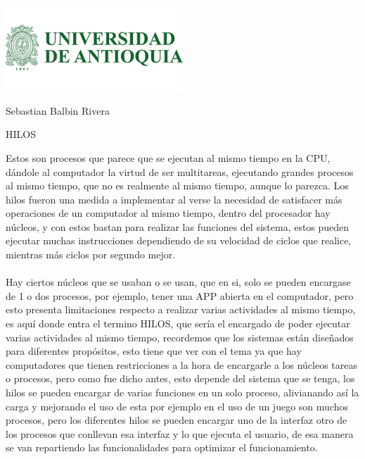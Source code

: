 \documentclass[12pt]{letter}
\begin{document}
\begin{center}
\includegraphics[width=0.5\textwidth]{logo-udea.png}\\
\end{center}

Sebastian Balbin Rivera\\
\begin{center}
HILOS
\end{center}
Estos son procesos que parece que se ejecutan al mismo tiempo en la CPU, dándole al computador la virtud de ser multitareas, ejecutando grandes procesos al mismo tiempo, que no es realmente al mismo tiempo, aunque lo parezca. Los hilos fueron una medida a implementar al verse la necesidad de satisfacer más operaciones de un computador al mismo tiempo, dentro del procesador hay núcleos, y con estos bastan para realizar las funciones del sistema, estos pueden ejecutar muchas instrucciones dependiendo de su velocidad de ciclos que realice, mientras más ciclos por segundo mejor. \\\\
Hay ciertos núcleos que se usaban o se usan, que en si, solo se pueden encargase de 1 o dos procesos, por ejemplo, tener una APP abierta en el computador, pero esto presenta limitaciones respecto a realizar varias actividades al mismo tiempo, es aquí donde entra el termino HILOS, que sería el encargado de poder ejecutar varias actividades al mismo tiempo, recordemos que los sistemas están diseñados para diferentes propósitos, esto tiene que ver con el tema ya que hay computadores que tienen restricciones a la hora de encargarle a los núcleos tareas o procesos, pero como fue dicho antes, esto depende del sistema que se tenga, los hilos se pueden encargar de varias funciones en un solo proceso, alivianando así la carga y mejorando el uso de esta por ejemplo en el uso de un juego son muchos procesos, pero los diferentes hilos se pueden encargar uno de la interfaz otro de los procesos que conllevan  esa interfaz y lo que ejecuta el usuario, de esa manera se van repartiendo las funcionalidades para optimizar el funcionamiento.\\\\
\end{document}
